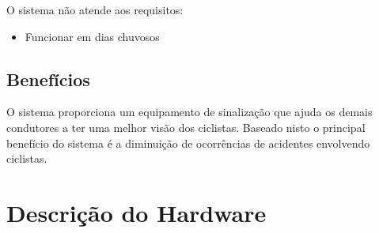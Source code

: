 \documentclass[conference]{IEEEtran}
\begin{document}
O sistema não atende aos requisitos:
\begin{itemize}
\item Funcionar em dias chuvosos
\end{itemize}

\subsection{Benefícios}
O sistema proporciona um equipamento de sinalização que ajuda os demais condutores
a ter uma melhor visão dos ciclistas. Baseado nisto o principal benefício do sistema
é a diminuição de ocorrências de acidentes envolvendo ciclistas.


\section{Descrição do Hardware}
\end{document}
